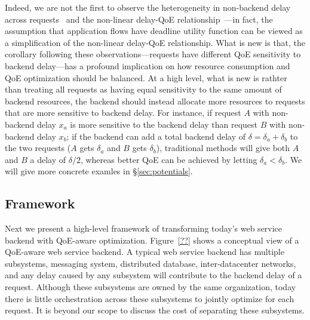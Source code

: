Indeed, we are not the first to observe the heterogeneity in non-backend delay across requests~\cite{timeciard,dqbarge} and the non-linear delay-QoE relationship~\cite{d3tcp, mun chiang's work}---in fact, the assumption that application flows have deadline utility function can be viewed as a simplification of the non-linear delay-QoE relationship.
What is new is that, the corollary following these observations---requests have different QoE sensitivity to backend delay---has a profound implication on how resource consumption and QoE optimization should be balanced.
At a high level, what is new is rathter than treating all requests as having equal sensitivity to the same amount of backend resources, the backend should instead allocate more resources to requests that are more sensitive to backend delay.
For instance, if request $A$ with non-backend delay $x_a$ is more sensitive to the backend delay than request $B$ with non-backend delay $x_b$; if the backend can add a total backend delay of $\delta=\delta_a+\delta_b$ to the two requests ($A$ gets $\delta_a$ and $B$ gets $\delta_b$), traditional methods will give both $A$ and $B$ a delay of $\delta/2$, whereas better QoE can be achieved by letting $\delta_a<\delta_b$. We will give more concrete examles in \S\ref{sec:potentials}.


\subsection{Framework}
\label{subsec:framework}
Next we present a high-level framework of transforming today's web service backend with QoE-aware optimization.
Figure~\ref{??} shows a conceptual view of a QoE-aware web service backend. 
A typical web service backend has multiple subsystems, \eg messaging system, distributed database, inter-datacenter networks, and any delay caused by any subsystem will contribute to the backend delay of a request.
Although these subsystems are owned by the same organization, today there is little orchestration across these subsystems to jointly optimize for each request. 
It is beyond our scope to discuss the cost of separating these subsystems. 

